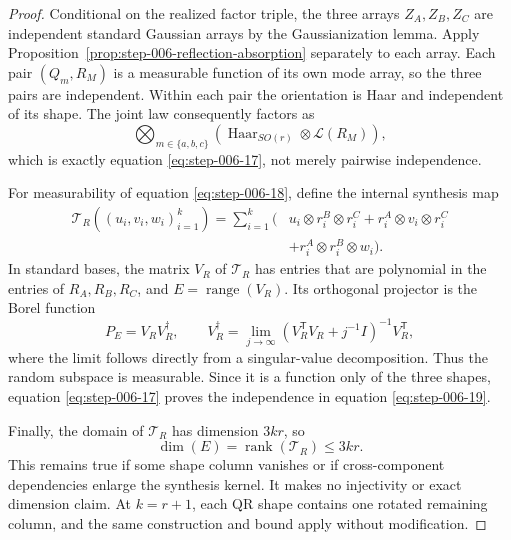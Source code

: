 \begin{proof}
Conditional on the realized factor triple, the
three arrays \(Z_A,Z_B,Z_C\) are independent standard Gaussian arrays by the
Gaussianization lemma. Apply
Proposition~\ref{prop:step-006-reflection-absorption} separately to each
array. Each pair \((Q_m,R_M)\) is a measurable function of its own mode array,
so the three pairs are independent. Within each pair the orientation is Haar
and independent of its shape. The joint law consequently factors as
\[
  \bigotimes_{m\in\{a,b,c\}}
    \left(\operatorname{Haar}_{SO(r)}\otimes\mathcal L(R_M)\right),
\]
which is exactly equation \eqref{eq:step-006-17}, not merely pairwise independence.

For measurability of equation \eqref{eq:step-006-18}, define the internal synthesis map
\begin{equation}
\begin{aligned}
  \mathcal T_R((u_i,v_i,w_i)_{i=1}^k)
  =\sum_{i=1}^k(&u_i\otimes r_i^B\otimes r_i^C
    +r_i^A\otimes v_i\otimes r_i^C\\
    &+r_i^A\otimes r_i^B\otimes w_i).
\end{aligned}\label{eq:step-006-20}
\end{equation}
In standard bases, the matrix \(V_R\) of \(\mathcal T_R\) has entries that
are polynomial in the entries of \(R_A,R_B,R_C\), and
\(E=\operatorname{range}(V_R)\). Its orthogonal projector is the Borel
function
\begin{equation}
  P_E=V_RV_R^\dagger,
  \qquad
  V_R^\dagger=\lim_{j\to\infty}
    (V_R^{\mathsf T}V_R+j^{-1}I)^{-1}V_R^{\mathsf T},          \label{eq:step-006-21}
\end{equation}
where the limit follows directly from a singular-value decomposition. Thus
the random subspace is measurable. Since it is a function only of the three
shapes, equation \eqref{eq:step-006-17} proves the independence in equation \eqref{eq:step-006-19}.

Finally, the domain of \(\mathcal T_R\) has dimension \(3kr\), so
\[
  \dim(E)=\operatorname{rank}(\mathcal T_R)\le3kr.
\]
This remains true if some shape column vanishes or if cross-component
dependencies enlarge the synthesis kernel. It makes no injectivity or exact
dimension claim. At \(k=r+1\), each QR shape contains one rotated remaining
column, and the same construction and bound apply without modification.


\end{proof}


